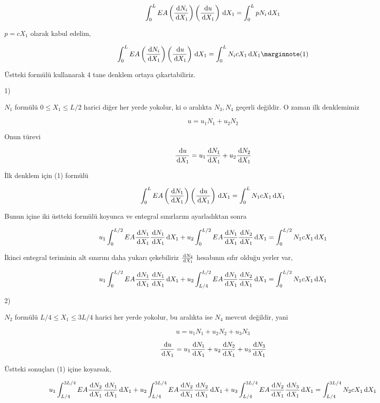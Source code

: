 \documentclass[12pt,fleqn]{article}\usepackage{../../common}
\begin{document}
$$
\int_{0}^{L} EA
\left( \frac{\,\mathrm{d} N_i}{\,\mathrm{d} X_1} \right)
\left( \frac{\,\mathrm{d} u}{\,\mathrm{d} X_1} \right)  \,\mathrm{d} X_1
= \int_{0}^{L} p N_i \,\mathrm{d} X_1
$$

$p = cX_1$ olarak kabul edelim, 

$$
\int_{0}^{L} EA
\left( \frac{\ud N_i}{\ud X_1} \right) 
\left( \frac{\ud u}{\ud X_1} \right) \ud X_1
= \int_{0}^{L} N_i c X_1 \ud X_1
\mlabel{1}
$$

Üstteki formülü kullanarak 4 tane denklem ortaya çıkartabiliriz.

1)

$N_1$ formülü $0 \le X_1 \le L/2$ harici diğer her yerde yokolur, ki o
aralıkta $N_3,N_4$ geçerli değildir. O zaman ilk denklemimiz

$$
u = u_1 N_1 + u_2 N_2 
$$

Onun türevi 

$$
\frac{\,\mathrm{d} u}{\,\mathrm{d} X_1} = u_1 \frac{\,\mathrm{d} N_1}{\,\mathrm{d} X_1} + u_2 \frac{\,\mathrm{d} N_2}{\,\mathrm{d} X_1} 
$$

İlk denklem için (1) formülü

$$
\int_{0}^{L} EA
\left( \frac{\,\mathrm{d} N_1}{\,\mathrm{d} X_1} \right) 
\left( \frac{\,\mathrm{d} u}{\,\mathrm{d} X_1} \right) \,\mathrm{d} X_1
= \int_{0}^{L} N_1 c X_1 \,\mathrm{d} X_1
$$

Bunun içine iki üstteki formülü koyunca ve entegral sınırlarını ayarladıktan
sonra

$$
u_1 \int_{0}^{L/2} EA \frac{\,\mathrm{d} N_1}{\,\mathrm{d} X_1} \frac{\,\mathrm{d} N_1}{\,\mathrm{d} X_1} \,\mathrm{d} X_1 +
u_2 \int_{0}^{L/2} EA \frac{\,\mathrm{d} N_1}{\,\mathrm{d} X_1} \frac{\,\mathrm{d} N_2}{\,\mathrm{d} X_1} \,\mathrm{d} X_1 =
\int_{0}^{L/2} N_1 c X_1 \,\mathrm{d} X_1
$$

İkinci entegral teriminin alt sınırını daha yukarı çekebiliriz $\frac{\,\mathrm{d} N_2}{\,\mathrm{d} X_1}$
hesabının sıfır olduğu yerler var, 

$$
u_1 \int_{0}^{L/2} EA \frac{\,\mathrm{d} N_1}{\,\mathrm{d} X_1} \frac{\,\mathrm{d} N_1}{\,\mathrm{d} X_1} \,\mathrm{d} X_1 +
u_2 \int_{L/4}^{L/2} EA \frac{\,\mathrm{d} N_1}{\,\mathrm{d} X_1} \frac{\,\mathrm{d} N_2}{\,\mathrm{d} X_1} \,\mathrm{d} X_1 =
\int_{0}^{L/2} N_1 c X_1 \,\mathrm{d} X_1
$$

2)

$N_2$ formülü $L/4 \le X_1 \le 3L/4$ harici her yerde yokolur, bu aralıkta
ise $N_4$ mevcut değildir, yani

$$
u = u_1 N_1 + u_2 N_2 + u_3 N_3
$$

$$
\frac{\,\mathrm{d} u}{\,\mathrm{d} X_1} =
u_1 \frac{\,\mathrm{d} N_1}{\,\mathrm{d} X_1} + 
u_2 \frac{\,\mathrm{d} N_2}{\,\mathrm{d} X_1} + 
u_3 \frac{\,\mathrm{d} N_3}{\,\mathrm{d} X_1} 
$$

Üstteki sonuçları (1) içine koyarsak,

$$
u_1 \int_{L/4}^{3L/4} EA \frac{\,\mathrm{d} N_2}{\,\mathrm{d} X_1} \frac{\,\mathrm{d} N_1}{\,\mathrm{d} X_1} \,\mathrm{d} X_1 +
u_2 \int_{L/4}^{3L/4} EA \frac{\,\mathrm{d} N_2}{\,\mathrm{d} X_1} \frac{\,\mathrm{d} N_2}{\,\mathrm{d} X_1} \,\mathrm{d} X_1  +
u_3 \int_{L/4}^{3L/4} EA \frac{\,\mathrm{d} N_2}{\,\mathrm{d} X_1} \frac{\,\mathrm{d} N_3}{\,\mathrm{d} X_1} \,\mathrm{d} X_1 =
\int_{L/4}^{3L/4} N_2 c X_1 \,\mathrm{d} X_1
$$
\end{document}
